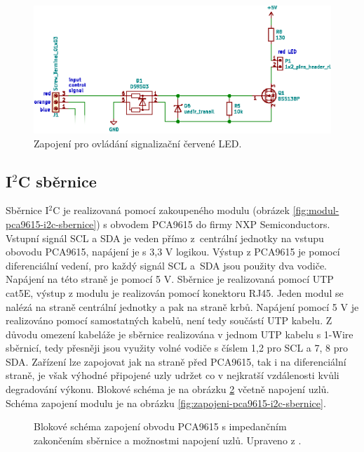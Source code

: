 \begin{figure}[H]
    \centering
    \includegraphics[width=\textwidth]{images/svg/kicad/ochrana-krby-lcd-teplotni-senzor.eps}
    \caption[Zapojení pro ovládání signalizační červené LED.]{Zapojení pro ovládání signalizační červené LED.}
    \label{fig:ochrana-krby-lcd-teplotni-senzor}
\end{figure}

\subsection{I$^2$C sběrnice}
Sběrnice I$^2$C je realizovaná pomocí zakoupeného modulu (obrázek \ref{fig:modul-pca9615-i2c-sbernice}) s obvodem PCA9615 do firmy  NXP Semiconductors. Vstupní signál SCL a SDA je veden přímo z~centrální jednotky na vstupu obovodu PCA9615, napájení je s 3,3 V logikou. Výstup z PCA9615 je pomocí diferenciální vedení, pro každý signál SCL a~SDA jsou použity dva vodiče. Napájení na této straně je pomocí 5 V. Sběrnice je realizovaná pomocí UTP cat5E, výstup z modulu je realizován pomocí konektoru RJ45. Jeden modul se nalézá na straně centrální jednotky a pak na straně krbů. Napájení pomocí 5 V je realizováno pomocí samostatných kabelů, není tedy součástí UTP kabelu. Z důvodu omezení kabeláže je sběrnice realizována v jednom UTP kabelu s 1-Wire sběrnicí, tedy přesněji jsou využity volné vodiče s číslem 1,2 pro SCL a 7, 8 pro SDA. Zařízení lze zapojovat jak na straně před PCA9615, tak i na diferenciální straně, je však výhodné připojené uzly udržet co v nejkratší vzdálenosti kvůli degradování výkonu. Blokové schéma je na obrázku \ref{fig:blokove-schema-pca9615-i2c-sbernice} včetně napojení uzlů. Schéma zapojení modulu je na obrázku \ref{fig:zapojeni-pca9615-i2c-sbernice}.

\begin{figure}[H]
    \centering
    \def\svgwidth{\columnwidth}
    
    \caption{Blokové schéma zapojení obvodu PCA9615 s impedančním zakončením sběrnice a možnostmi napojení uzlů. Upraveno z \cite{pca9615-schema-zapojeni}.}
    \label{fig:blokove-schema-pca9615-i2c-sbernice}
\end{figure}

